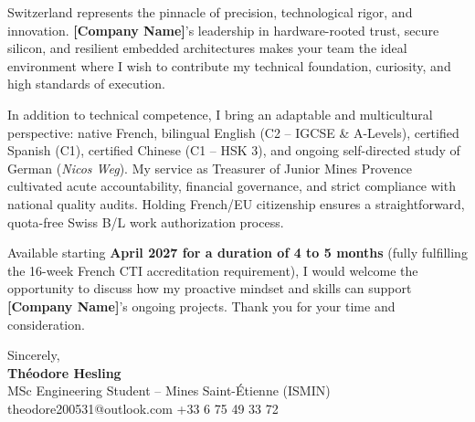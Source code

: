 \documentclass[10.5pt,a4paper]{article}
\begin{document}
Switzerland represents the pinnacle of precision, technological rigor, and innovation. \textbf{[Company Name]}'s leadership in hardware-rooted trust, secure silicon, and resilient embedded architectures makes your team the ideal environment where I wish to contribute my technical foundation, curiosity, and high standards of execution.

In addition to technical competence, I bring an adaptable and multicultural perspective: native French, bilingual English (C2 -- IGCSE \& A-Levels), certified Spanish (C1), certified Chinese (C1 -- HSK 3), and ongoing self-directed study of German (\textit{Nicos Weg}). My service as Treasurer of Junior Mines Provence cultivated acute accountability, financial governance, and strict compliance with national quality audits. Holding French/EU citizenship ensures a straightforward, quota-free Swiss B/L work authorization process.

Available starting \textbf{April 2027 for a duration of 4 to 5 months} (fully fulfilling the 16-week French CTI accreditation requirement), I would welcome the opportunity to discuss how my proactive mindset and skills can support \textbf{[Company Name]}'s ongoing projects. Thank you for your time and consideration.

\vspace{14pt}
\noindent Sincerely,\\[18pt]
\textbf{Théodore Hesling}\\[2pt]
{\small MSc Engineering Student -- Mines Saint-Étienne (ISMIN)\\
theodore200531@outlook.com \quad +33 6 75 49 33 72}
\end{document}
